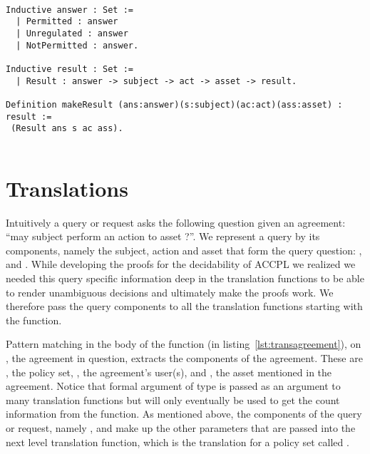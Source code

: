 \begin{minipage}[c]{0.95\textwidth}
\begin{lstlisting}

Inductive answer : Set :=
  | Permitted : answer
  | Unregulated : answer
  | NotPermitted : answer.
  
Inductive result : Set :=
  | Result : answer -> subject -> act -> asset -> result.
 
Definition makeResult (ans:answer)(s:subject)(ac:act)(ass:asset) : result := 
 (Result ans s ac ass).
 
\end{lstlisting}
\end{minipage}

\section{Translations}\label{sec:translationfuncs}

Intuitively a query or request asks the following question given an agreement: ``may subject  perform an action  to asset ?''. We represent a query by its components, namely the subject, action and asset that form the query question: ,  and . While developing the proofs for the decidability of \ac{ACCPL} we realized we needed this query specific information deep in the translation functions to be able to render unambiguous decisions and ultimately make the proofs work. We therefore pass the query components to all the translation functions starting with the  function. 

Pattern matching in the body of the  function (in listing~\ref{lst:transagreement}), on , the agreement in question, extracts the components of the agreement. These are , the policy set, , the agreement's user(s), and , the asset mentioned in the agreement. Notice that formal argument  of type  is passed as an argument to many translation functions but will only eventually be used to get the count information from the  function. As mentioned above, the components of the query or request, namely ,  and  make up the other parameters that are passed into the next level translation function, which is the translation for a policy set called .

